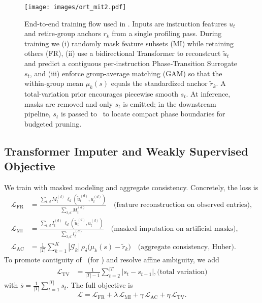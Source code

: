 \begin{figure*}[!htbp]
\centering
\texttt{[image: images/ort\_mit2.pdf]}
\caption{End‑to‑end training flow used in \name. Inputs are instruction features \(u_t\) and retire‑group anchors \(r_k\) from a single profiling pass. During training we (i) randomly mask feature subsets (MI) while retaining others (FR), (ii) use a bidirectional Transformer to reconstruct \(\tilde{u}_t\) and predict a contiguous per‑instruction Phase‑Transition Surrogate \(s_t\), and (iii) enforce group‑average matching (GAM) so that the within‑group mean \(\mu_k(s)\) equals the standardized anchor \(\tilde{r}_k\). A total‑variation prior encourages piecewise smooth \(s_t\). At inference, masks are removed and only \(s_t\) is emitted; in the downstream pipeline, \(s_t\) is passed to \cpd\ to locate compact phase boundaries for budgeted pruning. }
\label{fig:saits}
\end{figure*}


\subsection{Transformer Imputer and Weakly Supervised Objective}
We train with masked modeling and aggregate consistency. Concretely, the loss is
\begin{align}
\mathcal{L}_{\mathrm{FR}} &=\frac{\sum_{t,d}M_t^{(d)}\,\ell_d(\tilde{u}_t^{(d)},u_t^{(d)})}{\sum_{t,d}M_t^{(d)}}
\quad\text{(feature reconstruction on observed entries)}, \nonumber\\
\mathcal{L}_{\mathrm{MI}} &=\frac{\sum_{t,d}I_t^{(d)}\,\ell_d(\tilde{u}_t^{(d)},u_t^{(d)})}{\sum_{t,d}I_t^{(d)}}
\quad\text{(masked imputation on artificial masks)}, \nonumber\\
\mathcal{L}_{\mathrm{AC}} &= \frac{1}{|T|}\sum_{k=1}^K |\mathcal{G}_k|\,\rho_\delta\!\big(\mu_k(s)-\tilde{r}_k\big)
\quad\text{(aggregate consistency, Huber)}. \label{eq:ac}
\end{align}
To promote contiguity of \pts\ (for \cpd) and resolve affine ambiguity, we add 
\begin{align}
\mathcal{L}_{\mathrm{TV}} &= \frac{1}{|T|-1}\sum_{t=2}^{|T|} |s_t-s_{t-1}|, \text{(total\ variation)}
\end{align}
with \(\bar{s}=\tfrac{1}{|T|}\sum_{t=1}^{|T|} s_t\).
The full objective is
\begin{equation}
\mathcal{L} =\mathcal{L}_{\mathrm{FR}} + \lambda\,\mathcal{L}_{\mathrm{MI}} + \gamma\,\mathcal{L}_{\mathrm{AC}} +  \eta\,\mathcal{L}_{\mathrm{TV}}. \label{eq:full}
\end{equation}

